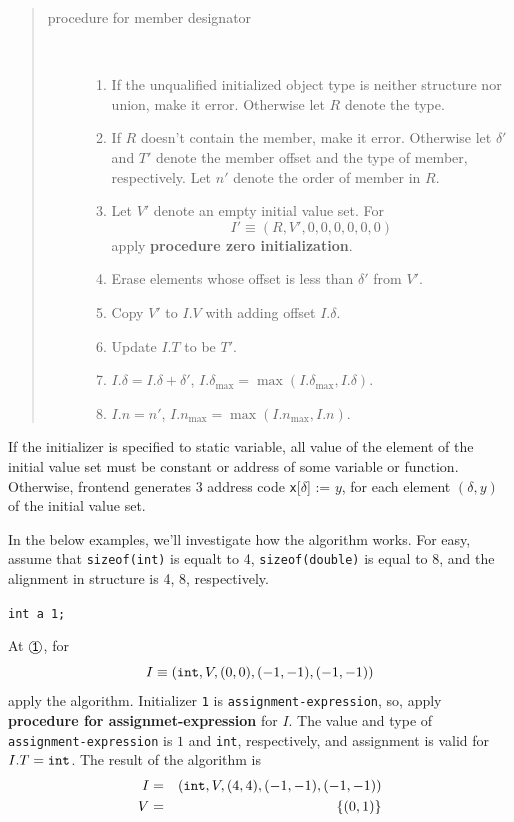 \begin{quotation}
\begin{description}
\item[procedure for member designator]

\

\begin{enumerate}
\item If the unqualified initialized object type is neither
      structure nor union, make it error. Otherwise
      let $R$ denote the type.
\item If $R$ doesn't contain the member, make it error.
      Otherwise let ${\delta}'$ and $T'$ denote the member offset
      and the type of member, respectively. Let $n'$
      denote the order of member in $R$.
\item Let $V'$ denote an empty
      initial value set. For
\[
 I' \equiv (R,V',0,0,0,0,0,0)
\]
apply {\bf procedure zero initialization}.

\item Erase elements whose offset is less than ${\delta}'$
from $V'$. 

\item Copy $V'$ to $I.V$ with adding offset $I.\delta$.

\item Update $I.T$ to be $T'$.
\item $I.\delta = I.\delta + \delta'$,
      $I.{\delta_{\max}} = {\max}(I.{\delta_{\max}},I.{\delta})$.
\item $I.n = n'$, $I.n_{\max} = \max(I.n_{\max},I.n)$.
\end{enumerate}

\end{description}
\end{quotation}

If the initializer is specified to static variable,
all value of the element of the initial value set must be 
constant or address of some variable or function.
Otherwise, frontend generates 3 address code
{\tt{x}}[$\delta$] := $y$, 
for each element $(\delta,y)$ of the initial value set.

In the below examples, we'll investigate how the algorithm
works. For easy, assume that {\tt{sizeof(int)}} is equalt to 4,
 {\tt{sizeof(double)}} is equal to 8, and the alignment in 
structure is 4, 8, respectively.

\begin{Example}
\label{initializer000}
{{\tt int a  1;}}

\noindent
At $\MARU{\tt 1}$, for
\[
I \equiv ({\tt{int}},V,(0,0),(-1,-1),(-1,-1))
\]
apply the algorithm. Initializer {\tt 1}
is {\tt assignment-expression}, so,
apply  {\bf procedure for assignmet-expression} for $I$.
The value and type of \\
{\tt assignment-expression} is $1$ and {\tt{int}},
respectively, and assignment is valid for $I.T = {\tt{int}}$.
The result of the algorithm is
\begin{eqnarray*}
I & = & ({\tt{int}},V,(4,4),(-1,-1),(-1,-1)) \\
V & = & \{(0,1)\}
\end{eqnarray*}
\end{Example}

